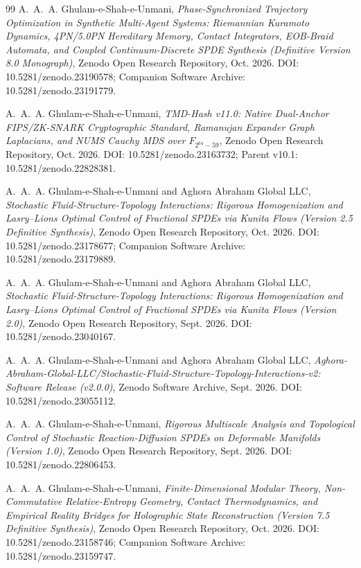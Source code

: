 \documentclass[11pt,a4paper,reqno]{article}
\def\texttt#1{#1}%
\def\mathbb#1{#1}%
\def\zenodo#1{10.5281/zenodo.#1}%
\newcommand{\zenodo}[1]{\href{https://doi.org/10.5281/zenodo.#1}{\texttt{10.5281/\allowbreak zenodo.#1}}}
\theoremstyle{plain}
\theoremstyle{definition}
\theoremstyle{remark}
\numberwithin{equation}{section}
\begin{document}
\begin{thebibliography}{99}
A.~A.~A. Ghulam-e-Shah-e-Unmani,
\emph{Phase-Synchronized Trajectory Optimization in Synthetic Multi-Agent Systems: Riemannian Kuramoto Dynamics, 4PN/5.0PN Hereditary Memory, Contact Integrators, EOB-Braid Automata, and Coupled Continuum-Discrete SPDE Synthesis (Definitive Version 8.0 Monograph)},
Zenodo Open Research Repository, Oct. 2026.
\texttt{DOI:} \zenodo{23190578}; Companion Software Archive: \zenodo{23191779}.

A.~A.~A. Ghulam-e-Shah-e-Unmani,
\emph{TMD-Hash v11.0: Native Dual-Anchor FIPS/ZK-SNARK Cryptographic Standard, Ramanujan Expander Graph Laplacians, and NUMS Cauchy MDS over $\mathbb{F}_{2^{64}-59}$},
Zenodo Open Research Repository, Oct. 2026.
\texttt{DOI:} \zenodo{23163732}; Parent v10.1: \zenodo{22828381}.

A.~A.~A. Ghulam-e-Shah-e-Unmani and {Aghora Abraham Global LLC},
\emph{Stochastic Fluid-Structure-Topology Interactions: Rigorous Homogenization and Lasry--Lions Optimal Control of Fractional SPDEs via Kunita Flows (Version 2.5 Definitive Synthesis)},
Zenodo Open Research Repository, Oct. 2026.
\texttt{DOI:} \zenodo{23178677}; Companion Software Archive: \zenodo{23179889}.

A.~A.~A. Ghulam-e-Shah-e-Unmani and {Aghora Abraham Global LLC},
\emph{Stochastic Fluid-Structure-Topology Interactions: Rigorous Homogenization and Lasry--Lions Optimal Control of Fractional SPDEs via Kunita Flows (Version 2.0)},
Zenodo Open Research Repository, Sept. 2026.
\texttt{DOI:} \zenodo{23040167}.

A.~A.~A. Ghulam-e-Shah-e-Unmani and {Aghora Abraham Global LLC},
\emph{Aghora-Abraham-Global-LLC/Stochastic-Fluid-Structure-Topology-Interactions-v2: Software Release (v2.0.0)},
Zenodo Software Archive, Sept. 2026.
\texttt{DOI:} \zenodo{23055112}.

A.~A.~A. Ghulam-e-Shah-e-Unmani,
\emph{Rigorous Multiscale Analysis and Topological Control of Stochastic Reaction-Diffusion SPDEs on Deformable Manifolds (Version 1.0)},
Zenodo Open Research Repository, Sept. 2026.
\texttt{DOI:} \zenodo{22806453}.

A.~A.~A. Ghulam-e-Shah-e-Unmani,
\emph{Finite-Dimensional Modular Theory, Non-Commutative Relative-Entropy Geometry, Contact Thermodynamics, and Empirical Reality Bridges for Holographic State Reconstruction (Version 7.5 Definitive Synthesis)},
Zenodo Open Research Repository, Oct. 2026.
\texttt{DOI:} \zenodo{23158746}; Companion Software Archive: \zenodo{23159747}.


\end{thebibliography}
\end{document}
